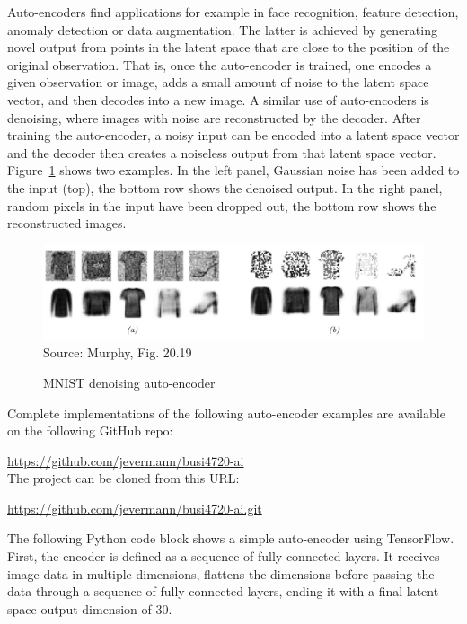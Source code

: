 Auto-encoders find applications for example in face recognition, feature detection, anomaly detection or data augmentation. The latter is achieved by generating novel output from points in the latent space that are close to the position of the original observation. That is, once the auto-encoder is trained, one encodes a given observation or image, adds a small amount of noise to the latent space vector, and then decodes into a new image. A similar use of auto-encoders is denoising, where images with noise are reconstructed by the decoder. After training the auto-encoder, a noisy input can be encoded into a latent space vector and the decoder then creates a noiseless output from that latent space vector. Figure~\ref{fig:murphy_20_19} shows two examples. In the left panel, Gaussian noise has been added to the input (top), the bottom row shows the denoised output. In the right panel, random pixels in the input have been dropped out, the bottom row shows the reconstructed images.

\begin{figure}
\begin{center}
\includegraphics[width=\textwidth]{murphy_20_19.png} \\

\scriptsize Source: Murphy, Fig. 20.19 \normalsize
\end{center}
\caption{MNIST denoising auto-encoder}
\label{fig:murphy_20_19}
\end{figure}


\begin{resourcebox}
Complete implementations of the following auto-encoder examples are available on the following GitHub repo:

\url{https://github.com/jevermann/busi4720-ai} \\

The project can be cloned from this URL:

\url{https://github.com/jevermann/busi4720-ai.git}
\end{resourcebox}

The following Python code block shows a simple auto-encoder using TensorFlow. First, the encoder is defined as a sequence of fully-connected layers. It receives image data in multiple dimensions, flattens the dimensions before passing the data through a sequence of fully-connected layers, ending it with a final latent space output dimension of $30$. 

